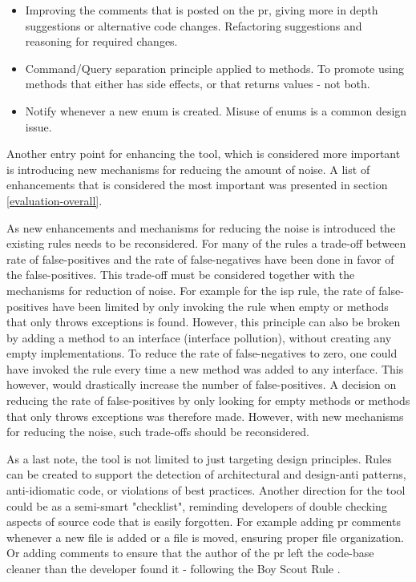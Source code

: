 \documentclass[pdftex,10pt,b5paper,twoside]{report}
\begin{document}
\begin{itemize}
    \item Improving the comments that is posted on the \gls{pr}, giving more in depth suggestions or alternative code changes. Refactoring suggestions and reasoning for required changes.  
    
    \item Command/Query separation principle applied to methods. To promote using methods that either has side effects, or that returns values - not both. 
    
    \item Notify whenever a new enum is created. Misuse of enums is a common design issue.
\end{itemize}


Another entry point for enhancing the tool, which is considered more important is introducing new mechanisms for reducing the amount of noise. A list of enhancements that is considered the most important was presented in section \ref{evaluation-overall}. 

As new enhancements and mechanisms for reducing the noise is introduced the existing rules needs to be reconsidered. For many of the rules a trade-off between rate of false-positives and the rate of false-negatives have been done in favor of the false-positives. This trade-off must be considered together with the mechanisms for reduction of noise. For example for the \gls{isp} rule, the rate of false-positives have been limited by only invoking the rule when empty or methods that only throws exceptions is found. However, this principle can also be broken by adding a method to an interface (interface pollution), without creating any empty implementations. To reduce the rate of false-negatives to zero, one could have invoked the rule every time a new method was added to any interface. This however, would drastically increase the number of false-positives. A decision on reducing the rate of false-positives by only looking for empty methods or methods that only throws exceptions was therefore made. However, with new mechanisms for reducing the noise, such trade-offs should be reconsidered. 

As a last note, the tool is not limited to just targeting design principles. Rules can be created to support the detection of architectural and design-anti patterns, anti-idiomatic code, or violations of best practices. Another direction for the tool could be as a semi-smart "checklist", reminding developers of double checking aspects of source code that is easily forgotten. For example adding \gls{pr} comments whenever a new file is added or a file is moved, ensuring proper file organization. Or adding comments to ensure that the author of the \gls{pr} left the code-base cleaner than the developer found it - following the Boy Scout Rule \cite{boy-scout}.
\end{document}
